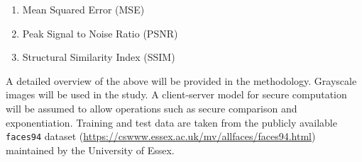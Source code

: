 \begin{enumerate}
		\item Mean Squared Error (MSE)
		\item Peak Signal to Noise Ratio (PSNR)
		\item Structural Similarity Index (SSIM)
\end{enumerate}
A detailed overview of the above will be provided in the methodology. Grayscale images will be used in the study.
A client-server model for secure computation will be assumed to allow operations such as secure comparison and exponentiation.
Training and test data are taken from the publicly available \texttt{faces94} dataset (\url{https://cswww.essex.ac.uk/mv/allfaces/faces94.html}) maintained by the University of Essex. 
